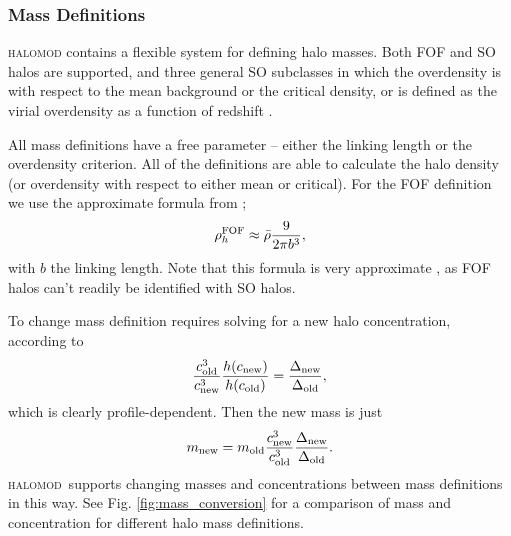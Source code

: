 \documentclass[5p,aas_macros]{elsarticle}
\newcommand{\halomod}{\textsc{halomod}}
\begin{document}
\subsubsection{Mass Definitions}
\label{sec:halomod:components:mass-def}
\textsc{halomod} contains a flexible system for defining halo masses. 
Both FOF and SO halos are supported, and three general SO subclasses in which the overdensity is with respect to the mean background or the critical density, or is defined as the virial overdensity as a function of redshift \citep{Bryan1998}. 

All mass definitions have a free parameter -- either the linking length or the overdensity criterion. All of the definitions are able to calculate the halo density (or overdensity with respect to either mean or critical). For the FOF definition we use the approximate formula from \cite{White2001};
\begin{equation}
    \rho_h^{\rm FOF} \approx \bar{\rho} \frac{9}{2\pi b^3},
\end{equation}
with $b$ the linking length. Note that this formula is very approximate \citep{More2011}, as FOF halos can't readily be identified with SO halos. 

To change mass definition requires solving for a new halo concentration, according to
\begin{equation}
    \frac{c_{\rm old}^3}{c_{\rm new}^3} \frac{h(c_{\rm new})}{h(c_{\rm old})} = \frac{\Delta_{\rm new}}{\Delta_{\rm old}},
\end{equation}
which is clearly profile-dependent. Then the new mass is just
\begin{equation}
    m_{\rm new} = m_{\rm old} \frac{c_{\rm new}^3}{c_{\rm old}^3} \frac{\Delta_{\rm new}}{\Delta_{\rm old}}.
\end{equation}
\halomod\  supports changing masses and concentrations between mass definitions in this way. 
See Fig. \ref{fig:mass_conversion} for a comparison of mass and concentration for different halo mass definitions.
\end{document}
